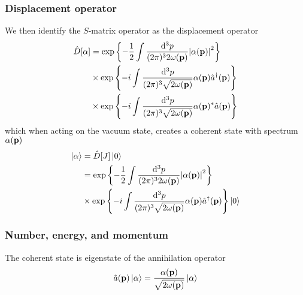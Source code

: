 \subsubsection{Displacement operator}

We then identify the $S$-matrix operator as the displacement operator
\begin{equation}
	\begin{split}
		\hat{D}[\alpha]
		&=
		\exp\left\{
			-
			\frac{1}{2}
			\int\frac{\dd[3]{p}}{(2\pi)^32\omega(\vb{p})}
			\abs{\alpha(\vb{p})}^2
		\right\}
		\\
		&\times
		\exp\left\{
			-i
			\int\frac{\dd[3]{p}}{(2\pi)^3\sqrt{2\omega(\vb{p})}}
			\alpha(\vb{p})
			\hat{a}^\dagger(\vb{p})
		\right\}
		\\
		&\times
		\exp\left\{
			-i
			\int\frac{\dd[3]{p}}{(2\pi)^3\sqrt{2\omega(\vb{p})}}
			\alpha(\vb{p})^*
			\hat{a}(\vb{p})
		\right\}
	\end{split}
\end{equation}
which when acting on the vacuum state, creates a coherent state with spectrum $\alpha(\vb{p})$
\begin{equation}
	\begin{split}
		\ket{\alpha}
		&=
		\hat{D}[J]
		\ket{0}
		\\
		&=
		\exp\left\{
			-
			\frac{1}{2}
			\int\frac{\dd[3]{p}}{(2\pi)^32\omega(\vb{p})}
			\abs{\alpha(\vb{p})}^2
		\right\}
		\\
		&\times
		\exp\left\{
			-i
			\int\frac{\dd[3]{p}}{(2\pi)^3\sqrt{2\omega(\vb{p})}}
			\alpha(\vb{p})
			\hat{a}^\dagger(\vb{p})
		\right\}
		\ket{0}
	\end{split}
\end{equation}

\subsubsection{Number, energy, and momentum}

The coherent state is eigenstate of the annihilation operator
\begin{equation}
	\hat{a}(\vb{p})
	\ket{\alpha}
	=
	\frac{\alpha(\vb{p})}{\sqrt{2\omega(\vb{p})}}
	\ket{\alpha}
\end{equation}

